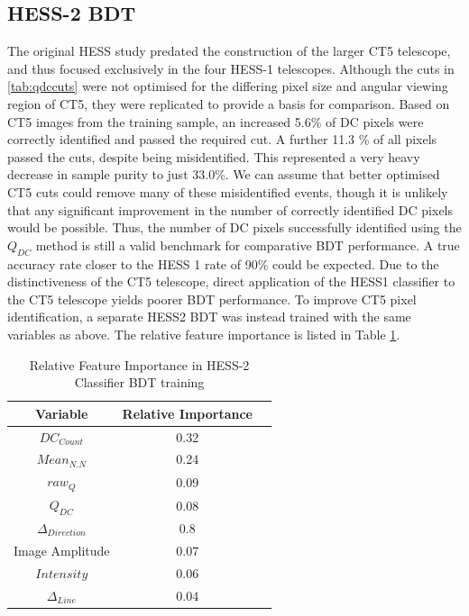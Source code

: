 \documentclass[11pt]{article}
\begin{document}
\subsection{HESS-2 BDT}
The original HESS study predated the construction of the larger CT5 telescope, and thus focused exclusively in the four HESS-1 telescopes. Although the cuts in \ref{tab:qdccuts} were not optimised for the differing pixel size and angular viewing region of CT5, they were replicated to provide a basis for comparison. Based on CT5 images from the training sample, an increased 5.6\% of DC pixels were correctly identified and passed the required cut. A further 11.3 \% of all pixels passed the cuts, despite being misidentified. This represented a very heavy decrease in sample purity to just 33.0\%. We can assume that better optimised CT5 cuts could remove many of these misidentified events, though it is unlikely that any significant improvement in the number of correctly identified DC pixels would be possible. Thus, the number of DC pixels successfully identified using the $Q_{DC}$ method is still a valid benchmark for comparative BDT performance. A true accuracy rate closer to the HESS 1 rate of 90\% could be expected. Due to the distinctiveness of the CT5 telescope, direct application of the HESS1 classifier to the CT5 telescope yields poorer BDT performance. To improve CT5 pixel identification, a separate HESS2 BDT was instead trained with the same variables as above. The relative feature importance is listed in Table \ref{tab:hess2classifier}. 

\begin{table}[h!]
  \centering
  \caption{Relative Feature Importance in HESS-2 Classifier BDT training}
  \label{tab:hess2classifier}
  \begin{tabular}{ccc}
    \toprule
    Variable & Relative Importance\\
    \midrule
    $DC_{Count}$ & 0.32\\
    $Mean_{N.N}$ & 0.24\\
    $raw_{Q}$ & 0.09\\
    $Q_{DC}$ & 0.08\\
    $\Delta_{Direction}$ & 0.8\\
    Image Amplitude & 0.07\\
    $Intensity$ & 0.06\\
    $\Delta_{Line}$ & 0.04\\
    \bottomrule
  \end{tabular}
\end{table}
\end{document}
